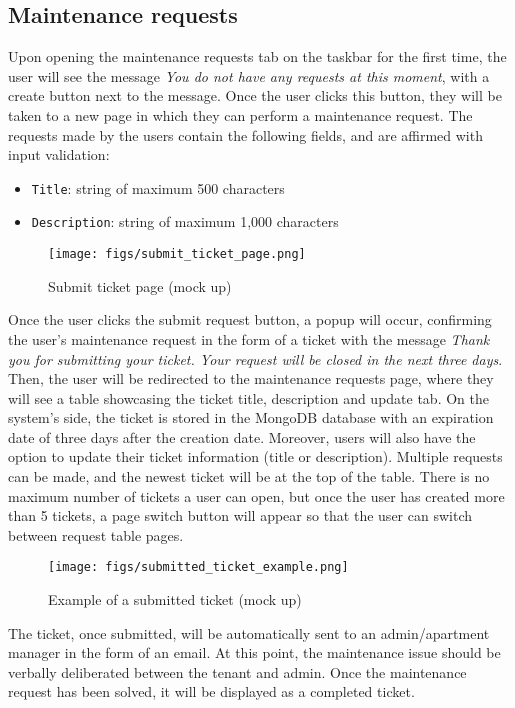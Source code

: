 \documentclass[conference]{IEEEtran}
\begin{document}
\subsection{Maintenance requests}
Upon opening the maintenance requests tab on the taskbar for the first time, the user will see the message \textit{You do not have any requests at this moment}, with a create button next to the message. Once the user clicks this button, they will be taken to a new page in which they can perform a maintenance request. The requests made by the users contain the following fields, and are affirmed with input validation:
\begin{itemize}
    \item \texttt{Title}: string of maximum 500 characters
    \item \texttt{Description}: string of maximum 1,000 characters
\end{itemize}
\begin{figure}
\centering
\texttt{[image: figs/submit\_ticket\_page.png]}
\caption{Submit ticket page (mock up)}
\label{fig:Submit ticket page}
\end{figure}

Once the user clicks the submit request button, a popup will occur, confirming the user's maintenance request in the form of a ticket with the message \textit{Thank you for submitting your ticket. Your request will be closed in the next three days}. Then, the user will be redirected to the maintenance requests page, where they will see a table showcasing the ticket title, description and update tab. On the system’s side, the ticket is stored in the MongoDB database with an expiration date of three days after the creation date. Moreover, users will also have the option to update their ticket information (title or description). Multiple requests can be made, and the newest ticket will be at the top of the table. There is no maximum number of tickets a user can open, but once the user has created more than 5 tickets, a page switch button will appear so that the user can switch between request table pages.
\begin{figure}
\centering
\texttt{[image: figs/submitted\_ticket\_example.png]}
\caption{Example of a submitted ticket (mock up)}
\label{fig:Example of a submitted ticket}
\end{figure}
The ticket, once submitted, will be automatically sent to an admin/apartment manager in the form of an email. At this point, the maintenance issue should be verbally deliberated between the tenant and admin. Once the maintenance request has been solved, it will be displayed as a completed ticket. 
\end{document}
